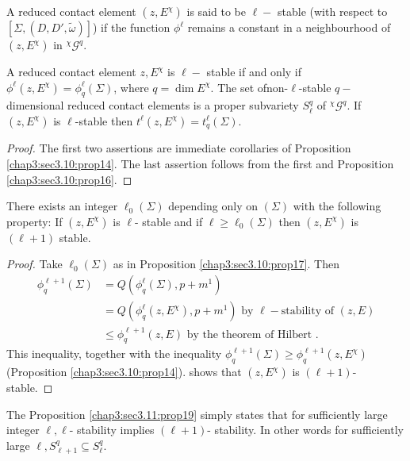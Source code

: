 \begin{defi*}
  A reduced contact element $(z, E^\chi)$ is said to be $\ell -$
  stable (with respect to $[\Sigma, (D, D', \tilde{\omega})]$) if the
  function $\phi^\ell$ remains a constant in a neighbourhood of $(z,
  E^\chi)$ in $^{\chi} \mathscr{G}^q$. 
\end{defi*}

\begin{proposition}\label{chap3:sec3.11:prop18}%
  A reduced contact element $z, E^\chi$ is $\ell-$ stable if and only
  if $\phi^\ell(z, E^\chi)= \phi^\ell_q (\Sigma)$, where $q=\dim
  E^\chi$. The set of\pageoriginale non-$\ell$-stable $q-$dimensional reduced
  contact elements is a proper subvariety $S^q_\ell $ of $^{\chi}
  \mathscr{G}^q$. If $(z, E^\chi)$ is $\ell$-stable then $t^\ell (z,
  E^\chi)= t^\ell_q (\Sigma)$. 
\end{proposition}

\begin{proof}
  The first two assertions are immediate corollaries of Proposition
  \ref{chap3:sec3.10:prop14}. The last assertion follows from the
  first and Proposition \ref{chap3:sec3.10:prop16}. 
\end{proof}

\begin{proposition}\label{chap3:sec3.11:prop19}%
  There exists an integer $\ell_0 (\Sigma) $ depending only on
  $(\Sigma)$ with the following property: If $(z, E^\chi)$ is $\ell$-
  stable and if $\ell \geq \ell_0 (\Sigma)$ then $(z, E^\chi)$ is
  $(\ell + 1)$ stable. 
\end{proposition}

\begin{proof}
  Take $\ell_0(\Sigma)$ as in Proposition \ref{chap3:sec3.10:prop17}. Then 
  \begin{align*}
    \phi^{\ell+1}_q (\Sigma)&= Q (\phi^\ell_q (\Sigma), p+m^1)\\
    &= Q(\phi^\ell_q (z,E^\chi), p+m^1) \text{ by } \ell- \text{
      stability of }(z, E)\\ 
    &\leq \phi^{\ell + 1}_q (z, E) \text{ by the theorem of Hilbert .}
  \end{align*}
  This inequality, together with the inequality $\phi^{\ell + 1}_q
  (\Sigma) \geq  \phi^{\ell + 1}_q (z, E^\chi)$\break (Proposition
  \ref{chap3:sec3.10:prop14}). shows that $(z, E^\chi)$ is $(\ell +
  1)$- stable.  
\end{proof}

The Proposition \ref{chap3:sec3.11:prop19} simply states that for sufficiently large integer
$\ell, \ell$- stability implies $(\ell + 1)$- stability. In other
words for sufficiently large $\ell, S^q_{\ell + 1} \subseteq
S^q_\ell$. 


